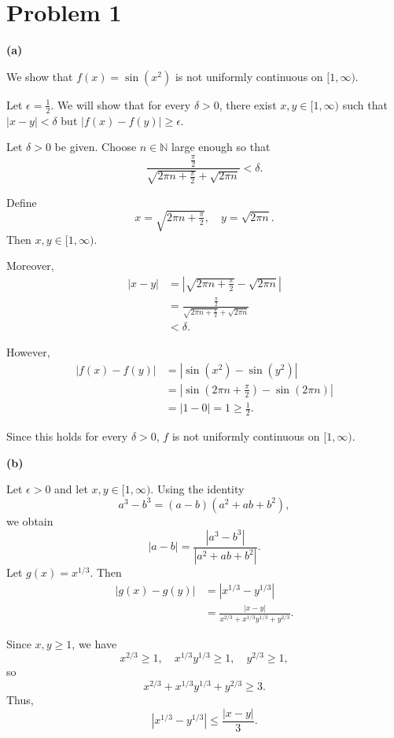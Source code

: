 \documentclass[12pt]{article}
\begin{document}
\section*{Problem 1}
\textbf{(a)} 

We show that $f(x) = \sin(x^2)$ is not uniformly continuous on $[1,\infty)$.

Let $\epsilon = \tfrac{1}{2}$. We will show that for every $\delta > 0$, there exist 
$x,y \in [1,\infty)$ such that $|x-y| < \delta$ but $|f(x)-f(y)| \ge \epsilon$.

Let $\delta > 0$ be given. Choose $n \in \mathbb{N}$ large enough so that
\[
\frac{\tfrac{\pi}{2}}{\sqrt{2\pi n + \tfrac{\pi}{2}} + \sqrt{2\pi n}} < \delta.
\]

Define
\[
x = \sqrt{2\pi n + \tfrac{\pi}{2}}, \quad y = \sqrt{2\pi n}.
\]
Then $x,y \in [1,\infty)$.

Moreover,
\begin{align*}
|x-y|
&= \left| \sqrt{2\pi n + \tfrac{\pi}{2}} - \sqrt{2\pi n} \right| \\
&= \frac{\tfrac{\pi}{2}}{\sqrt{2\pi n + \tfrac{\pi}{2}} + \sqrt{2\pi n}} \\
&< \delta.
\end{align*}

However,
\begin{align*}
|f(x) - f(y)|
&= |\sin(x^2) - \sin(y^2)| \\
&= |\sin(2\pi n + \tfrac{\pi}{2}) - \sin(2\pi n)| \\
&= |1 - 0| = 1 \ge \tfrac{1}{2}.
\end{align*}

Since this holds for every $\delta > 0$, $f$ is not uniformly continuous on $[1,\infty)$.

\bigskip

\textbf{(b)} 

Let $\epsilon > 0$ and let $x,y \in [1,\infty)$. Using the identity
\[
a^3 - b^3 = (a-b)(a^2 + ab + b^2),
\]
we obtain
\[
|a-b| = \frac{|a^3 - b^3|}{|a^2 + ab + b^2|}.
\]
Let $g(x) = x^{1/3}$. Then
\begin{align*}
|g(x) - g(y)|
&= |x^{1/3} - y^{1/3}| \\
&= \frac{|x-y|}{x^{2/3} + x^{1/3}y^{1/3} + y^{2/3}}.
\end{align*}

Since $x,y \ge 1$, we have
\[
x^{2/3} \ge 1, \quad x^{1/3}y^{1/3} \ge 1, \quad y^{2/3} \ge 1,
\]
so
\[
x^{2/3} + x^{1/3}y^{1/3} + y^{2/3} \ge 3.
\]
Thus,
\[
|x^{1/3} - y^{1/3}| \le \frac{|x-y|}{3}.
\]
\end{document}
